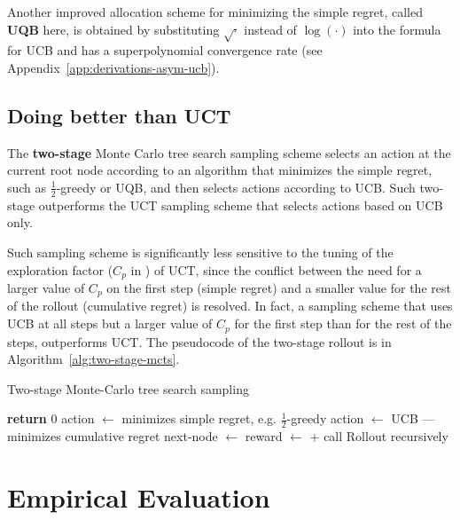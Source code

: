\documentclass{article}
\begin{document}
Another improved allocation scheme for minimizing the simple regret,
called \textbf{UQB} here, is obtained by substituting $\sqrt{\cdot}$
instead of $\log(\cdot)$ into the formula for UCB and has a
superpolynomial convergence rate (see
Appendix~\ref{app:derivations-asym-ucb}).

\subsection{Doing better than UCT}

The {\bf two-stage} Monte Carlo tree search sampling
scheme selects an action at the current root node according to an
algorithm that minimizes the simple regret, such as $\frac 1 2$-greedy or
UQB, and then selects actions according to UCB. Such two-stage
outperforms the UCT sampling scheme that selects actions based on
UCB only.

Such sampling scheme is significantly less sensitive to the tuning of
the exploration factor ($C_p$ in \cite{Kocsis.uct}) of UCT, since the
conflict \cite{Bubeck.pure} between the need for a larger value of
$C_p$ on the first step (simple regret) and a smaller value for the
rest of the rollout (cumulative regret) is resolved. In fact, a
sampling scheme that uses UCB at all steps but a larger value of $C_p$
for the first step than for the rest of the steps, outperforms
UCT. The pseudocode of the two-stage rollout is in
Algorithm~\ref{alg:two-stage-mcts}.

\begin{algorithm}[t]
\caption{Two-stage Monte-Carlo tree search sampling}
\label{alg:two-stage-mcts}
\begin{algorithmic}[1]
    \State \textbf{return} 0
  \Else
      \State action $\gets$  \Comment minimizes simple regret, e.g. $\frac 1 2$-greedy
    \Else
      \State action $\gets$  \Comment  UCB --- minimizes cumulative regret
    \EndIf
    \State next-node $\gets$ 
    \State reward $\gets$ 
    \State \hspace{4em} +  \Comment call {\sc Rollout} recursively
    \State {}
  \EndIf
\EndProcedure
\end{algorithmic}
\end{algorithm}

\section{Empirical Evaluation}
\end{document}
